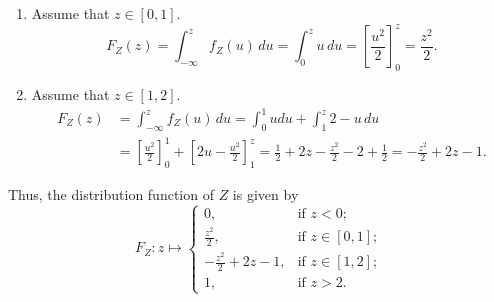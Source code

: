 \begin{enumerate}
    \item[(i)] Assume that $z \in [0,1]$.
    \[
        F_Z(z)
            = \int_{- \infty}^{z} f_Z(u) \, du
            = \int_{0}^{z} u \, du
            = \left[\frac{u^2}{2}\right]_0^z
            = \frac{z^2}{2}.
    \]

    \item[(ii)] Assume that $z \in [1,2]$.
    \begin{align*}
        F_Z(z)
            &= \int_{- \infty}^{z} f_Z(u) \, du
            = \int_{0}^{1} u du + \int_{1}^{z} 2-u \, du \\
            &= \left[\frac{u^2}{2}\right]_0^1 + \left[2u -  \frac{u^2}{2}\right]_1^z
            = \frac{1}{2} + 2z - \frac{z^2}{2} - 2 + \frac{1}{2}
            = - \frac{z^2}{2} + 2z - 1.
    \end{align*}
\end{enumerate}
Thus, the distribution function of $Z$ is given by
\[
    F_Z: z \mapsto
    \begin{cases}
        0,                          &\text{if }z  < 0; \\
        \frac{z^2}{2},              &\text{if }z \in [0,1]; \\
        - \frac{z^2}{2} + 2z - 1,   &\text{if }z \in [1,2]; \\
        1,                          &\text{if }z > 2.
    \end{cases}
\]

